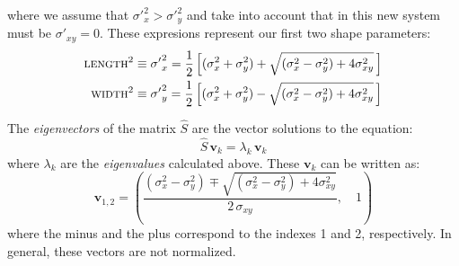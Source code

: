 %
where we assume that ${\sigma'}_x^2 > {\sigma'}_y^2$ and take into
account that in this new system must be ${\sigma'}_{xy}=0$. These
expresions represent our first two shape parameters:
%
\begin{align}
  \label{eq:lengthwidth}
  \text{\scshape length}^2 &\equiv {\sigma'}_x^2 = 
  \frac{1}{2}\left[(\sigma_x^2+\sigma_y^2) +
    \sqrt{(\sigma_x^2-\sigma_y^2) + 4\sigma_{xy}^2}\,\right] \\
  \text{\scshape width}^2 &\equiv {\sigma'}_y^2 = 
  \frac{1}{2}\left[(\sigma_x^2+\sigma_y^2) -
    \sqrt{(\sigma_x^2-\sigma_y^2) + 4\sigma_{xy}^2}\,\right]
\end{align}

The \emph{eigenvectors} of the matrix $\hat{S}$ are the vector
solutions to the equation:
%
\begin{equation}
  \label{eq:eigenveceq}
  \hat{S}\,\mathbf{v}_k = \lambda_k\,\mathbf{v}_k
\end{equation}
%
where $\lambda_k$ are the \emph{eigenvalues} calculated above. These
$\mathbf{v}_k$ can be written as:
%
\begin{equation}
  \label{eq:eigenvec}
  \mathbf{v}_{1,2} = \left(
    \frac{(\sigma_x^2-\sigma_y^2) \mp
      \sqrt{(\sigma_x^2-\sigma_y^2) + 4\sigma_{xy}^2}}{2\,\sigma_{xy}},
    \quad 1 \right)
\end{equation}
%
where the minus and the plus correspond to the indexes 1 and 2,
respectively. In general, these vectors are not normalized.

